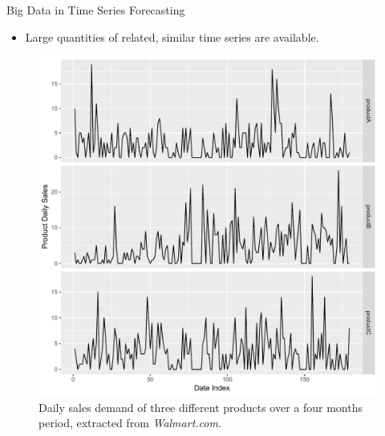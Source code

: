 \documentclass{beamer}
\begin{document}
\begin{frame}{Big Data in Time Series Forecasting}
\begin{itemize}
\item Large quantities of related, similar time series are available.
\end{itemize}
 \begin{figure}
   \includegraphics[scale=0.30]{images/walmart}
   \caption{\tiny {Daily sales demand of three different products over a four months period, extracted from  \textit{Walmart.com}\cite{Bandara2019-bg}.}}
  \end{figure}
\end{frame}
  
\end{document}
